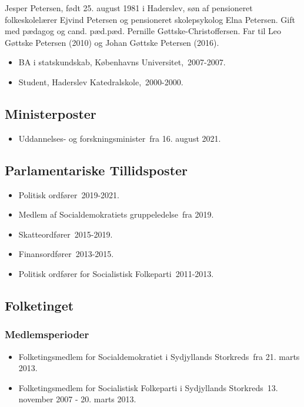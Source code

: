 \documentclass[11pt, a4paper]{awesome-cv}
\begin{document}
\makecvheader[R]
\makelettertitle
\begin{cvletter}
Jesper Petersen, født 25. august 1981 i Haderslev, søn af pensioneret folkeskolelærer Ejvind Petersen og pensioneret skolepsykolog Elna Petersen. Gift med pædagog og cand. pæd.pæd. Pernille Gøttske-Christoffersen. Far til Leo Gøttske Petersen (2010) og Johan Gøttske Petersen (2016).

\begin{itemize}
\item BA i statskundskab, Københavns Universitet, 2007-2007.
\item Student, Haderslev Katedralskole, 2000-2000.
\end{itemize}
\subsection*{Ministerposter}
\begin{itemize}
\item Uddannelses- og forskningsminister fra 16. august 2021.
\end{itemize}
\subsection*{Parlamentariske Tillidsposter}
\begin{itemize}
\item Politisk ordfører 2019-2021.
\item Medlem af Socialdemokratiets gruppeledelse fra 2019.
\item Skatteordfører 2015-2019.
\item Finansordfører 2013-2015.
\item Politisk ordfører for Socialistisk Folkeparti 2011-2013.
\end{itemize}
\subsection*{Folketinget}
\subsubsection*{Medlemsperioder}
\begin{itemize}
\item Folketingsmedlem for Socialdemokratiet i Sydjyllands Storkreds fra 21. marts 2013.
\item Folketingsmedlem for Socialistisk Folkeparti i Sydjyllands Storkreds 13. november 2007 - 20. marts 2013.
\end{itemize}

\end{cvletter}
\end{document}
